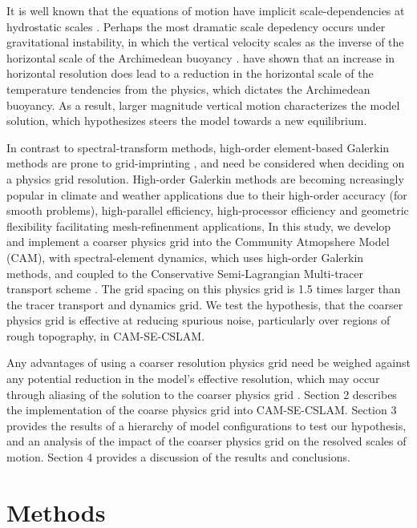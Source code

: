\documentclass{agujournal}
\begin{document}
It is well known that the equations of motion have implicit scale-dependencies at hydrostatic scales \citep{O1981JAS}. Perhaps the most dramatic scale depedency occurs under gravitational instability, in which the vertical velocity scales as the inverse of the horizontal scale of the Archimedean buoyancy \citep{JR2016QJRMS,HR2017JCLIM,HR2018JAMES}. \cite{HR2018JAMES} have shown that an increase in horizontal resolution does lead to a reduction in the horizontal scale of the temperature tendencies from the physics, which dictates the Archimedean buoyancy. As a result, larger magnitude vertical motion characterizes the model solution, which \cite{HR2017JCLIM} hypothesizes steers the model towards a new equilibrium.

In contrast to spectral-transform methods, high-order element-based Galerkin methods are prone to grid-imprinting \citep{HL2018MWR}, and need be considered when deciding on a physics grid resolution. High-order Galerkin methods are becoming ncreasingly popular in climate and weather applications due to their high-order accuracy (for smooth problems), high-parallel efficiency, high-processor efficiency and geometric flexibility facilitating mesh-refinenment applications, In this study, we develop and implement a coarser physics grid into the Community Atmopshere Model (CAM), with spectral-element dynamics, which uses high-order Galerkin methods, and coupled to the Conservative Semi-Lagrangian Multi-tracer transport scheme \citep[CAM-SE-CSLAM; ][]{LTOUNGK2017MWR}. The grid spacing on this physics grid is 1.5 times larger than the tracer transport and dynamics grid. We test the hypothesis, that the coarser physics grid is effective at reducing spurious noise, particularly over regions of rough topography, in CAM-SE-CSLAM. 

Any advantages of using a coarser resolution physics grid need be weighed against any potential reduction in the model's effective resolution, which may occur through aliasing of the solution to the coarser physics grid \citep{W1999T}. Section 2 describes the implementation of the coarse physics grid into CAM-SE-CSLAM. Section 3 provides the results of a hierarchy of model configurations to test our hypothesis, and an analysis of the impact of the coarser physics grid on the resolved scales of motion. Section 4 provides a discussion of the results and conclusions.

\section{Methods}
\end{document}
